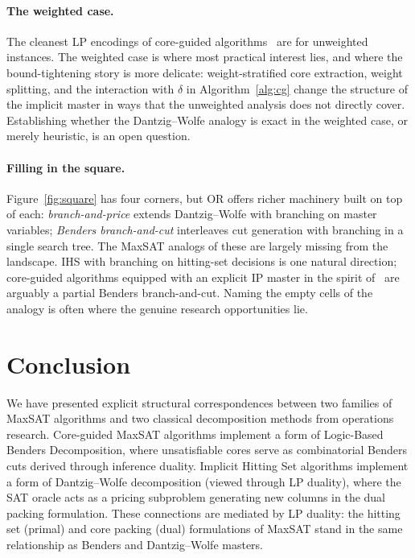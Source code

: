 \documentclass[11pt,a4paper]{article}
\begin{document}
\paragraph{The weighted case.} The cleanest LP encodings of core-guided
algorithms~\citep{katsirelos2023analysis} are for unweighted instances. The
weighted case is where most practical interest lies, and where the
bound-tightening story is more delicate: weight-stratified core extraction,
weight splitting, and the interaction with $\delta$ in
Algorithm~\ref{alg:cg} change the structure of the implicit master in ways
that the unweighted analysis does not directly cover. Establishing whether the
Dantzig--Wolfe analogy is exact in the weighted case, or merely heuristic, is
an open question.

\paragraph{Filling in the square.} Figure~\ref{fig:square} has four corners,
but OR offers richer machinery built on top of each: \emph{branch-and-price}
extends Dantzig--Wolfe with branching on master variables; \emph{Benders
branch-and-cut} interleaves cut generation with branching in a single
search tree. The MaxSAT analogs of these are largely missing from the
landscape. IHS with branching on hitting-set decisions is one natural
direction; core-guided algorithms equipped with an explicit IP master in the
spirit of~\citet{davies2013exploiting} are arguably a partial Benders
branch-and-cut. Naming the empty cells of the analogy is often where the
genuine research opportunities lie.

\section{Conclusion}
\label{sec:conclusion}

We have presented explicit structural correspondences between two families of
MaxSAT algorithms and two classical decomposition methods from operations
research. Core-guided MaxSAT algorithms implement a form of Logic-Based
Benders Decomposition, where unsatisfiable cores serve as combinatorial
Benders cuts derived through inference duality. Implicit Hitting Set
algorithms implement a form of Dantzig--Wolfe decomposition (viewed through LP
duality), where the SAT oracle acts as a pricing subproblem generating new
columns in the dual packing formulation. These connections are mediated by LP
duality: the hitting set (primal) and core packing (dual) formulations of
MaxSAT stand in the same relationship as Benders and Dantzig--Wolfe masters.
\end{document}
